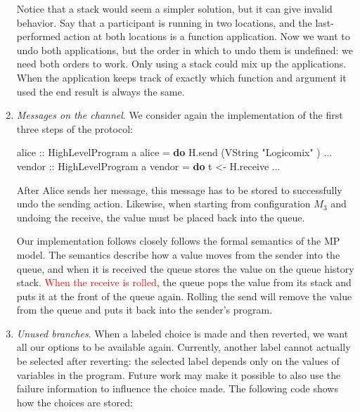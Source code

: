 \documentclass[runningheads,plain]{llncs}
\newcommand{\checkthis}[1]{\textcolor{red}{#1}}
\newenvironment{Shaded}{}{}
\newcommand{\KeywordTok}[1]{\textcolor[rgb]{0.00,0.44,0.13}{\textbf{#1}}}
\newcommand{\DataTypeTok}[1]{\textcolor[rgb]{0.56,0.13,0.00}{#1}}
\newcommand{\StringTok}[1]{\textcolor[rgb]{0.25,0.44,0.63}{#1}}
\newcommand{\OtherTok}[1]{\textcolor[rgb]{0.00,0.44,0.13}{#1}}
\newcommand{\FunctionTok}[1]{\textcolor[rgb]{0.02,0.16,0.49}{#1}}
\newcommand{\NormalTok}[1]{#1}
\begin{document}
\begin{enumerate}[1.]
 Notice that a stack would seem a simpler solution, but it
  can give invalid behavior. Say that a participant is running in two
  locations, and the last-performed action at both locations is a
  function application. Now we want to undo both applications, but the
  order in which to undo them is undefined: we need both orders to work.
  Only using a stack could mix up the applications. When the application
  keeps track of exactly which function and argument it used the end
  result is always the same.  \\
  
\item \emph{Messages on the channel}.
    We consider again the implementation of the first three steps of the protocol:

\begin{Shaded}
\begin{Highlighting}[]
\OtherTok{alice ::} \DataTypeTok{HighLevelProgram}\NormalTok{ a}
\NormalTok{alice }\FunctionTok{=} \KeywordTok{do} 
\NormalTok{    H.send (}\DataTypeTok{VString} \StringTok{"Logicomix"}\NormalTok{ )}
    \FunctionTok{...}
\OtherTok{vendor ::} \DataTypeTok{HighLevelProgram}\NormalTok{ a}
\NormalTok{vendor }\FunctionTok{=} \KeywordTok{do} 
\NormalTok{    t }\OtherTok{<-}\NormalTok{ H.receive }
    \FunctionTok{...}
\end{Highlighting}
\end{Shaded}

  After Alice sends her message, this message has to be stored to successfully undo the sending action.
  Likewise, when starting from configuration $M_3$ and undoing the receive,
  the value must be placed back into the queue. 

  Our implementation follows closely follows the formal semantics of the MP model. 
  The semantics describe how a value moves from the sender into the
  queue, and when it is received the queue stores the value on the queue
  history stack. \checkthis{When the receive is rolled}, the queue pops the value
  from its stack and puts it at the front of the queue again. Rolling
  the send will remove the value from the queue and puts it back into
  the sender's program. \\
  
\item \emph{Unused branches}.
  When a labeled choice is made and then reverted, we want all our options to be
  available again. Currently, another label cannot actually be selected
  after reverting: the selected label depends only on the values of
  variables in the program. Future work may make it possible to also use
  the failure information to influence the choice made.
   The following code shows how the choices are stored:


\end{enumerate}
\end{document}
